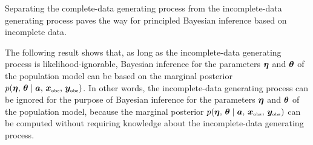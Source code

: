 Separating the complete-data generating process from the incomplete-data generating process paves the way for principled Bayesian inference based on incomplete data.

The following result shows that,
as long as the incomplete-data generating process is likelihood-ignorable,
Bayesian inference for the parameters $\boldsymbol{\eta}$ and $\boldsymbol{\theta}$ of the population model 
can be based on the marginal posterior $p(\boldsymbol{\eta},\, \boldsymbol{\theta} \mid \bm{a},\, \bm{x}_{\mbox{\tiny obs}},\, \bm{y}_{\mbox{\tiny obs}})$.
In other words,
the incomplete-data generating process can be ignored for the purpose of Bayesian inference for the parameters $\boldsymbol{\eta}$ and $\boldsymbol{\theta}$ of the population model,
because the marginal posterior $p(\boldsymbol{\eta},\, \boldsymbol{\theta} \mid \bm{a},\, \bm{x}_{\mbox{\tiny obs}},\, \bm{y}_{\mbox{\tiny obs}})$ can be computed without requiring knowledge about the incomplete-data generating process.
